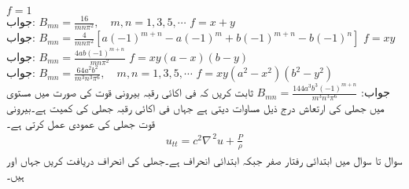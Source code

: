 \quad
$f=1$\\
جواب:\quad
$B_{mn}=\tfrac{16}{mn\pi^2}, \quad m,n=1,3,5,\cdots$
\quad
$f=x+y$\\
جواب:\quad
$B_{mn}=\tfrac{4}{mn\pi^2}[a(-1)^{m+n}-a(-1)^m+b(-1)^{m+n}-b(-1)^n]$
\quad
$f=xy$\\
جواب:\quad
$B_{mn}=\tfrac{4ab(-1)^{m+n}}{mn\pi^2}$
\quad
$f=xy(a-x)(b-y)$\\
جواب:\quad
$B_{mn}=\tfrac{64a^2b^2}{m^3n^3\pi^6},\quad m,n=1,3,5,\cdots$
\quad
$f=xy(a^2-x^2)(b^2-y^2)$\\
جواب:\quad
$B_{mn}=\tfrac{144a^3b^3(-1)^{m+n}}{m^3n^3\pi^6}$
\quad
ثابت کریں کہ فی اکائی رقبہ بیرونی قوت  کی صورت میں  مستوی میں جھلی کی ارتعاش درج ذیل مساوات دیتی ہے جہاں فی اکائی رقبہ جھلی کی کمیت  ہے۔بیرونی قوت جھلی کی عمودی عمل کرتی ہے۔
\begin{align*}
u_{tt}=c^2\nabla^{\,2}u+\frac{P}{\rho}
\end{align*}
سوال  تا سوال  میں ابتدائی رفتار صفر  جبکہ ابتدائی انحراف  ہے۔جھلی کی انحراف  دریافت کریں جہاں  اور  ہیں۔

